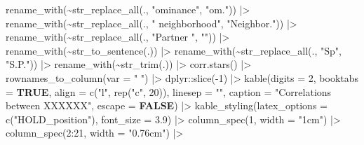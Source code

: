 \documentclass[
  bookmarksnumbered]{article}
\newenvironment{Shaded}{\begin{snugshade}}{\end{snugshade}}
\newcommand{\AttributeTok}[1]{\textcolor[rgb]{0.80,0.80,0.80}{#1}}
\newcommand{\ConstantTok}[1]{\textcolor[rgb]{0.86,0.64,0.64}{\textbf{#1}}}
\newcommand{\DecValTok}[1]{\textcolor[rgb]{0.86,0.86,0.80}{#1}}
\newcommand{\FloatTok}[1]{\textcolor[rgb]{0.75,0.75,0.82}{#1}}
\newcommand{\FunctionTok}[1]{\textcolor[rgb]{0.94,0.94,0.56}{#1}}
\newcommand{\NormalTok}[1]{\textcolor[rgb]{0.80,0.80,0.80}{#1}}
\newcommand{\SpecialCharTok}[1]{\textcolor[rgb]{0.86,0.64,0.64}{#1}}
\newcommand{\StringTok}[1]{\textcolor[rgb]{0.80,0.58,0.58}{#1}}
\begin{document}
\begin{Shaded}
\begin{Highlighting}[]
  \FunctionTok{rename\_with}\NormalTok{(}\SpecialCharTok{\textasciitilde{}}\FunctionTok{str\_replace\_all}\NormalTok{(., }\StringTok{"ominance"}\NormalTok{, }\StringTok{"om."}\NormalTok{)) }\SpecialCharTok{|\textgreater{}}
  \FunctionTok{rename\_with}\NormalTok{(}\SpecialCharTok{\textasciitilde{}}\FunctionTok{str\_replace\_all}\NormalTok{(., }\StringTok{" neighborhood"}\NormalTok{, }\StringTok{"Neighbor."}\NormalTok{)) }\SpecialCharTok{|\textgreater{}}
  \FunctionTok{rename\_with}\NormalTok{(}\SpecialCharTok{\textasciitilde{}}\FunctionTok{str\_replace\_all}\NormalTok{(., }\StringTok{"Partner "}\NormalTok{, }\StringTok{""}\NormalTok{)) }\SpecialCharTok{|\textgreater{}}
  \FunctionTok{rename\_with}\NormalTok{(}\SpecialCharTok{\textasciitilde{}}\FunctionTok{str\_to\_sentence}\NormalTok{(.)) }\SpecialCharTok{|\textgreater{}}
  \FunctionTok{rename\_with}\NormalTok{(}\SpecialCharTok{\textasciitilde{}}\FunctionTok{str\_replace\_all}\NormalTok{(., }\StringTok{"Sp"}\NormalTok{, }\StringTok{"S.P."}\NormalTok{)) }\SpecialCharTok{|\textgreater{}}
  \FunctionTok{rename\_with}\NormalTok{(}\SpecialCharTok{\textasciitilde{}}\FunctionTok{str\_trim}\NormalTok{(.)) }\SpecialCharTok{|\textgreater{}}
  \FunctionTok{corr.stars}\NormalTok{() }\SpecialCharTok{|\textgreater{}}
  \FunctionTok{rownames\_to\_column}\NormalTok{(}\AttributeTok{var =} \StringTok{" "}\NormalTok{) }\SpecialCharTok{|\textgreater{}} 
\NormalTok{  dplyr}\SpecialCharTok{::}\FunctionTok{slice}\NormalTok{(}\SpecialCharTok{{-}}\DecValTok{1}\NormalTok{) }\SpecialCharTok{|\textgreater{}} 
  \FunctionTok{kable}\NormalTok{(}\AttributeTok{digits =} \DecValTok{2}\NormalTok{,}
        \AttributeTok{booktabs =} \ConstantTok{TRUE}\NormalTok{,}
        \AttributeTok{align =} \FunctionTok{c}\NormalTok{(}\StringTok{"l"}\NormalTok{, }\FunctionTok{rep}\NormalTok{(}\StringTok{"c"}\NormalTok{, }\DecValTok{20}\NormalTok{)),}
        \AttributeTok{linesep =} \StringTok{""}\NormalTok{,}
        \AttributeTok{caption =} \StringTok{"Correlations between XXXXXX"}\NormalTok{,}
        \AttributeTok{escape =} \ConstantTok{FALSE}\NormalTok{) }\SpecialCharTok{|\textgreater{}}
  \FunctionTok{kable\_styling}\NormalTok{(}\AttributeTok{latex\_options =} \FunctionTok{c}\NormalTok{(}\StringTok{"HOLD\_position"}\NormalTok{),}
                \AttributeTok{font\_size =} \FloatTok{3.9}\NormalTok{) }\SpecialCharTok{|\textgreater{}}
  \FunctionTok{column\_spec}\NormalTok{(}\DecValTok{1}\NormalTok{, }\AttributeTok{width =} \StringTok{"1cm"}\NormalTok{) }\SpecialCharTok{|\textgreater{}}
  \FunctionTok{column\_spec}\NormalTok{(}\DecValTok{2}\SpecialCharTok{:}\DecValTok{21}\NormalTok{, }\AttributeTok{width =} \StringTok{"0.76cm"}\NormalTok{) }\SpecialCharTok{|\textgreater{}}

\end{Highlighting}
\end{Shaded}
\end{document}
